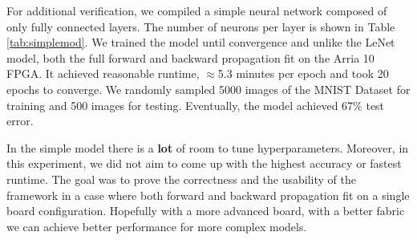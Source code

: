 For additional verification, we compiled a simple neural network composed of only fully connected layers. The number of neurons per layer is shown in Table \ref{tab:simplemod}. We trained the model until convergence and unlike the LeNet model, both the full forward and backward propagation fit on the Arria 10 FPGA. 
It achieved reasonable runtime, $\approx$5.3 minutes per epoch and took 20 epochs to converge. We randomly sampled 5000 images of the MNIST Dataset for training and 500 images for testing. Eventually, the model achieved 67\% test error. 

In the simple model there is a \textbf{lot} of room to tune hyperparameters. Moreover, in this experiment, we did not aim to come up with the highest accuracy or fastest runtime.  The goal was to prove the correctness and the usability of the framework in a case where both forward and backward propagation fit on a single board configuration. Hopefully with a more advanced board, with a better fabric we can achieve better performance for more complex models.

